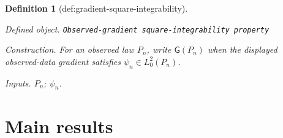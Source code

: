\documentclass{article}
\newtheorem{definition}{Definition}
\begin{document}
\begin{definition}[def:gradient-square-integrability]\label{def:gradient-square-integrability}
\par\smallskip\noindent\emph{Defined object.} \texttt{Observed-\allowbreak{}gradient square-\allowbreak{}integrability property}
\par\smallskip\noindent\emph{Construction.} For an observed law \(P_n\), write \(\mathsf G(P_n)\) when the displayed observed-data gradient satisfies \(\psi_n\in L_0^2(P_n)\).
\par\smallskip\noindent\emph{Inputs.} \(P_n\); \(\psi_n\).
\end{definition}

\section{Main results}
\end{document}
